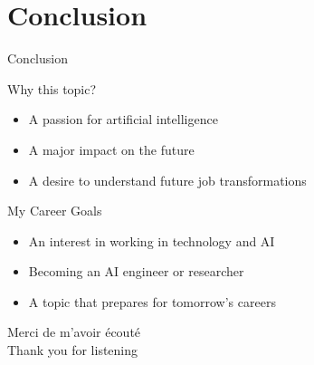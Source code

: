 \documentclass[aspectratio=169]{beamer}
\begin{document}
\section{Conclusion}
\begin{frame}{Conclusion}
\begin{block}{Why this topic?}
\begin{itemize}
\item A passion for artificial intelligence
\item A major impact on the future
\item A desire to understand future job transformations
\end{itemize}
\end{block}

\vspace{0.5cm}

\begin{block}{My Career Goals}
\begin{itemize}
\item An interest in working in technology and AI
\item Becoming an AI engineer or researcher
\item A topic that prepares for tomorrow’s careers
\end{itemize}
\end{block}
\end{frame}

\begin{frame}
\centering
\vfill
{\Huge Merci de m’avoir écouté}
\\
\vspace{1cm}
{\Huge Thank you for listening}
\vfill
\end{frame}
\end{document}
